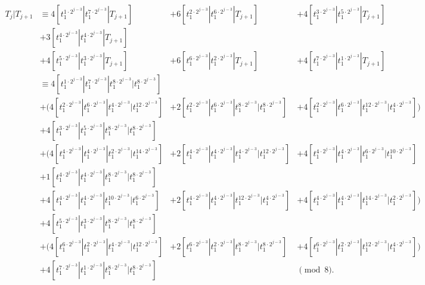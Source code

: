 \begin{exm}
{\footnotesize
  \begin{align*}
    T_j|T_{j+1} & \equiv 4 [t_1^{1 \cdot 2^{j-3}} | t_1^{7 \cdot 2^{j-3}}|T_{j+1}] &+ 6 [t_1^{2 \cdot 2^{j-3}} | t_1^{6 \cdot 2^{j-3}}|T_{j+1}] &+ 4 [t_1^{3 \cdot 2^{j-3}} | t_1^{5 \cdot 2^{j-3}}|T_{j+1}] \\ 
    &+ 3 [t_1^{4 \cdot 2^{j-3}} | t_1^{4 \cdot 2^{j-3}}|T_{j+1}] \\
                 &+ 4 [t_1^{5 \cdot 2^{j-3}} | t_1^{3 \cdot 2^{j-3}}|T_{j+1}] &+ 6 [t_1^{6 \cdot 2^{j-3}} | t_1^{2 \cdot 2^{j-3}}|T_{j+1}] &+ 4 [t_1^{7 \cdot 2^{j-3}} | t_1^{1 \cdot 2^{j-3}}|T_{j+1}]  \\   
   & \equiv 4 [t_1^{1 \cdot 2^{j-3}} | t_1^{7 \cdot 2^{j-3}} | t_1^{8 \cdot 2^{j-3}} | t_1^{8 \cdot 2^{j-3}} ] \\
    &+ (4 [t_1^{2 \cdot 2^{j-3}} | t_1^{6 \cdot 2^{j-3}} | t_1^{4 \cdot 2^{j-3}} | t_1^{12 \cdot 2^{j-3}}]
    &+ 2 [t_1^{2 \cdot 2^{j-3}} | t_1^{6 \cdot 2^{j-3}} | t_1^{8 \cdot 2^{j-3}} | t_1^{8 \cdot 2^{j-3}}]
    &+ 4 [t_1^{2 \cdot 2^{j-3}} | t_1^{6 \cdot 2^{j-3}} | t_1^{12 \cdot 2^{j-3}} | t_1^{4 \cdot 2^{j-3}}]) \\
    &+ 4 [t_1^{3 \cdot 2^{j-3}} | t_1^{5 \cdot 2^{j-3}} | t_1^{8 \cdot 2^{j-3}} | t_1^{8 \cdot 2^{j-3}}] \\
    &+ (4 [t_1^{4 \cdot 2^{j-3}} | t_1^{4 \cdot 2^{j-3}} | t_1^{2 \cdot 2^{j-3}} | t_1^{14 \cdot 2^{j-3}}]
    &+ 2 [t_1^{4 \cdot 2^{j-3}} | t_1^{4 \cdot 2^{j-3}} | t_1^{4 \cdot 2^{j-3}} | t_1^{12 \cdot 2^{j-3}}]
    &+ 4 [t_1^{4 \cdot 2^{j-3}} | t_1^{4 \cdot 2^{j-3}} | t_1^{6 \cdot 2^{j-3}} | t_1^{10 \cdot 2^{j-3}}] \\
    &+ 1 [t_1^{4 \cdot 2^{j-3}} | t_1^{4 \cdot 2^{j-3}} | t_1^{8 \cdot 2^{j-3}} | t_1^{8 \cdot 2^{j-3}}] \\
    &+ 4 [t_1^{4 \cdot 2^{j-3}} | t_1^{4 \cdot 2^{j-3}} | t_1^{10 \cdot 2^{j-3}} | t_1^{6 \cdot 2^{j-3}}]
    &+ 2 [t_1^{4 \cdot 2^{j-3}} | t_1^{4 \cdot 2^{j-3}} | t_1^{12 \cdot 2^{j-3}} | t_1^{4 \cdot 2^{j-3}}]
    &+ 4 [t_1^{4 \cdot 2^{j-3}} | t_1^{4 \cdot 2^{j-3}} | t_1^{14 \cdot 2^{j-3}} | t_1^{2 \cdot 2^{j-3}}])\\
    &+ 4 [t_1^{5 \cdot 2^{j-3}} | t_1^{3 \cdot 2^{j-3}} | t_1^{8 \cdot 2^{j-3}} | t_1^{8 \cdot 2^{j-3}}] \\
    &+ (4 [t_1^{6 \cdot 2^{j-3}} | t_1^{2 \cdot 2^{j-3}} | t_1^{4 \cdot 2^{j-3}} | t_1^{12 \cdot 2^{j-3}}]
    &+ 2 [t_1^{6 \cdot 2^{j-3}} | t_1^{2 \cdot 2^{j-3}} | t_1^{8 \cdot 2^{j-3}} | t_1^{8 \cdot 2^{j-3}}]
    &+ 4 [t_1^{6 \cdot 2^{j-3}} | t_1^{2 \cdot 2^{j-3}} | t_1^{12 \cdot 2^{j-3}} | t_1^{4 \cdot 2^{j-3}}])\\
    &+ 4 [t_1^{7 \cdot 2^{j-3}} | t_1^{1 \cdot 2^{j-3}} | t_1^{8 \cdot 2^{j-3}} | t_1^{8 \cdot 2^{j-3}}] & &\pmod{8}.
    \end{align*}}
  

\end{exm}

